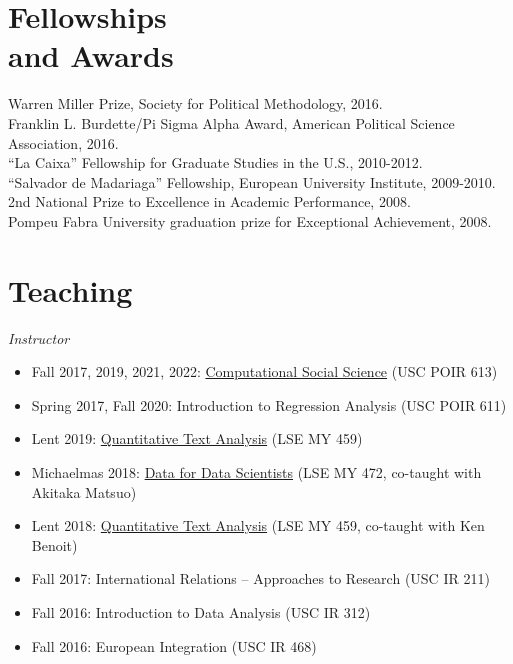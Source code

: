 \documentclass[margin,line,11pt]{resume}
\newcommand{\nl}{\vspace{0.10in}\\}
\begin{document}
\begin{resume}

    \section{\mysidestyle Fellowships\\ and Awards}
	Warren Miller Prize, Society for Political Methodology, 2016.\nl
    Franklin L. Burdette/Pi Sigma Alpha Award, American Political Science Association, 2016.\nl
	``La Caixa'' Fellowship for Graduate Studies in the U.S., 2010-2012. \nl
	``Salvador de Madariaga'' Fellowship, European University Institute, 2009-2010. \nl
	 2nd National Prize to Excellence in Academic Performance, 2008. \nl
	Pompeu Fabra University graduation prize for Exceptional Achievement, 2008.

            \section{\mysidestyle Teaching}

\emph{Instructor}
\begin{itemize}
\item Fall 2017, 2019, 2021, 2022: \href{http://pablobarbera.com/POIR613/}{Computational Social Science} (USC POIR 613)
\item Spring 2017, Fall 2020: Introduction to Regression Analysis (USC POIR 611)
\item Lent 2019: \href{https://lse-my459.github.io/}{Quantitative Text Analysis} (LSE MY 459)
\item Michaelmas 2018: \href{https://lse-my472.github.io/}{Data for Data Scientists} (LSE MY 472, co-taught with Akitaka Matsuo)
\item Lent 2018: \href{https://lse-my459.github.io/}{Quantitative Text Analysis} (LSE MY 459, co-taught with Ken Benoit)
\item Fall 2017: International Relations -- Approaches to Research (USC IR 211)
\item Fall 2016: Introduction to Data Analysis (USC IR 312)
\item Fall 2016: European Integration (USC IR 468)
\end{itemize}




\end{resume}
\end{document}
